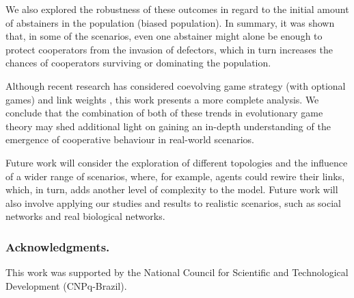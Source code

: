 \documentclass{llncs}
\begin{document}
We also explored the robustness of these outcomes in regard to the initial
amount of abstainers in the population (biased population). In summary, it was
shown that, in some of the scenarios, even one abstainer might alone be enough
to protect cooperators from the invasion of defectors, which in turn increases
the chances of cooperators surviving or dominating the population.

Although recent research has considered coevolving game strategy (with optional
games) and link weights \cite{Cardinot2016ecta}, this work presents a more complete
analysis. We conclude that the combination of both of these trends in
evolutionary game theory may shed additional light on gaining an in-depth
understanding of the emergence of cooperative behaviour in real-world
scenarios.

Future work will consider the exploration of different topologies and the
influence of a wider range of scenarios, where, for example, agents could
rewire their links, which, in turn, adds another level of complexity to the
model. Future work will also involve applying our studies and results to
realistic scenarios, such as social networks and real biological networks.


\bigskip
\subsubsection*{Acknowledgments. }
This work was supported by the National Council for Scientific and Technological Development (CNPq-Brazil).



\end{document}
